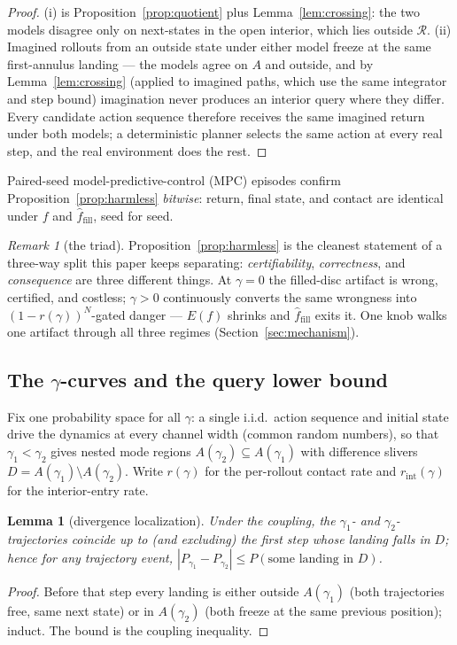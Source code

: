 \documentclass[11pt]{article}
\newtheorem{lemma}{Lemma}
\theoremstyle{remark}
\newtheorem{remark}{Remark}
\begin{document}
\begin{proof}
(i) is Proposition~\ref{prop:quotient} plus Lemma~\ref{lem:crossing}: the
two models disagree only on next-states in the open interior, which lies
outside $\mathcal{R}$. (ii) Imagined rollouts from an outside state under
either model freeze at the same first-annulus landing --- the models agree
on $A$ and outside, and by Lemma~\ref{lem:crossing} (applied to imagined
paths, which use the same integrator and step bound) imagination never
produces an interior query where they differ. Every candidate action
sequence therefore receives the same imagined return under both models; a
deterministic planner selects the same action at every real step, and the
real environment does the rest.
\end{proof}

Paired-seed model-predictive-control (MPC) episodes confirm
Proposition~\ref{prop:harmless} \emph{bitwise}: return, final state, and
contact are identical under $f$ and $\hat f_{\mathrm{fill}}$, seed for
seed.

\begin{remark}[the triad]
\label{rem:triad}
Proposition~\ref{prop:harmless} is the cleanest statement of a three-way
split this paper keeps separating: \emph{certifiability},
\emph{correctness}, and \emph{consequence} are three different things. At
$\gamma = 0$ the filled-disc artifact is wrong, certified, and costless;
$\gamma > 0$ continuously converts the same wrongness into
$(1 - r(\gamma))^N$-gated danger --- $E(f)$ shrinks and
$\hat f_{\mathrm{fill}}$ exits it. One knob walks one artifact through
all three regimes (Section~\ref{sec:mechanism}).
\end{remark}

\subsection{The $\gamma$-curves and the query lower bound}
\label{sec:gammacurves}

Fix one probability space for all $\gamma$: a single i.i.d.\ action
sequence and initial state drive the dynamics at every channel width
(common random numbers), so that $\gamma_1 < \gamma_2$ gives nested mode
regions $A(\gamma_2) \subseteq A(\gamma_1)$ with difference slivers
$D = A(\gamma_1) \setminus A(\gamma_2)$. Write $r(\gamma)$ for the
per-rollout contact rate and $r_{\mathrm{int}}(\gamma)$ for the
interior-entry rate.

\begin{lemma}[divergence localization]
\label{lem:divergence}
Under the coupling, the $\gamma_1$- and $\gamma_2$-trajectories coincide
up to (and excluding) the first step whose landing falls in $D$; hence for
any trajectory event, $|P_{\gamma_1} - P_{\gamma_2}| \le P(\text{some
landing in } D)$.
\end{lemma}
\begin{proof}
Before that step every landing is either outside $A(\gamma_1)$ (both
trajectories free, same next state) or in $A(\gamma_2)$ (both freeze at
the same previous position); induct. The bound is the coupling inequality.
\end{proof}
\end{document}
